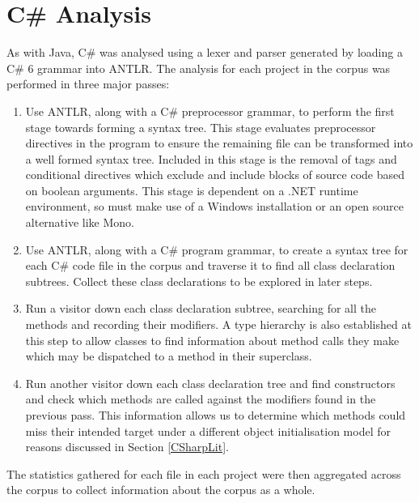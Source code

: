\section{C\# Analysis}
As with Java, C\# was analysed using a lexer and parser generated by loading a C\# 6 grammar into ANTLR. The analysis for each project in the corpus was performed in three major passes:
\begin{enumerate}
	\item Use ANTLR, along with a C\# preprocessor grammar, to perform the first stage towards forming a syntax tree. This stage evaluates preprocessor directives in the program to ensure the remaining file can be transformed into a well formed syntax tree. Included in this stage is the removal of  tags and conditional directives which exclude and include blocks of source code based on boolean arguments. This stage is dependent on a .NET runtime environment, so must make use of a Windows installation or an open source alternative like Mono.
	
	\item Use ANTLR, along with a C\# program grammar, to create a syntax tree for each C\# code file in the corpus and traverse it to find all class declaration subtrees. Collect these class declarations to be explored in later steps.
	
	\item Run a visitor down each class declaration subtree, searching for all the methods and recording their modifiers. A type hierarchy is also established at this step to allow classes to find information about method calls they make which may be dispatched to a method in their superclass.
	
	\item Run another visitor down each class declaration tree and find constructors and check which methods are called against the modifiers found in the previous pass. This information allows us to determine which methods could miss their intended target under a different object initialisation model for reasons discussed in Section \ref{CSharpLit}.
\end{enumerate}
The statistics gathered for each file in each project were then aggregated across the corpus to collect information about the corpus as a whole.

